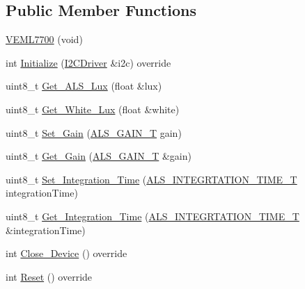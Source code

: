 \subsection*{Public Member Functions}
\begin{DoxyCompactItemize}
\item 
\hyperlink{classVEML7700_a6b351807d27da4e07ea3bb93bd3dcbb1}{V\+E\+M\+L7700} (void)
\item 
int \hyperlink{classVEML7700_af772ec5fe2bac04428479c9d232f1799}{Initialize} (\hyperlink{classI2CDriver}{I2\+C\+Driver} \&i2c) override
\item 
uint8\+\_\+t \hyperlink{classVEML7700_acf024ffb95cc98d82a708f511ec63d4e}{Get\+\_\+\+A\+L\+S\+\_\+\+Lux} (float \&lux)
\item 
uint8\+\_\+t \hyperlink{classVEML7700_a0f046c3327cac02f34cf9bfe2ac1231b}{Get\+\_\+\+White\+\_\+\+Lux} (float \&white)
\item 
uint8\+\_\+t \hyperlink{classVEML7700_aecbcabefbc9469ea91153723925acbd3}{Set\+\_\+\+Gain} (\hyperlink{classVEML7700_a7328cc2563da545e48ea72381dc7bd9b}{A\+L\+S\+\_\+\+G\+A\+I\+N\+\_\+T} gain)
\item 
uint8\+\_\+t \hyperlink{classVEML7700_a127d85c25f32b5bc0282fb04ad813fd6}{Get\+\_\+\+Gain} (\hyperlink{classVEML7700_a7328cc2563da545e48ea72381dc7bd9b}{A\+L\+S\+\_\+\+G\+A\+I\+N\+\_\+T} \&gain)
\item 
uint8\+\_\+t \hyperlink{classVEML7700_af3f3de94154ca1dd8905e932686ca23c}{Set\+\_\+\+Integration\+\_\+\+Time} (\hyperlink{classVEML7700_a82e8b8f9960d8f80bc31dcfe7133ad6e}{A\+L\+S\+\_\+\+I\+N\+T\+E\+G\+R\+T\+A\+T\+I\+O\+N\+\_\+\+T\+I\+M\+E\+\_\+T} integration\+Time)
\item 
uint8\+\_\+t \hyperlink{classVEML7700_a226efafb0bbc8068fbdf02f2d0afc0a0}{Get\+\_\+\+Integration\+\_\+\+Time} (\hyperlink{classVEML7700_a82e8b8f9960d8f80bc31dcfe7133ad6e}{A\+L\+S\+\_\+\+I\+N\+T\+E\+G\+R\+T\+A\+T\+I\+O\+N\+\_\+\+T\+I\+M\+E\+\_\+T} \&integration\+Time)
\item 
int \hyperlink{classVEML7700_af4be747d3c60af76ca46c7e4fb859ec7}{Close\+\_\+\+Device} () override
\item 
int \hyperlink{classVEML7700_a381358f8998260f4600a0d6713f7ea2a}{Reset} () override
\end{DoxyCompactItemize}
